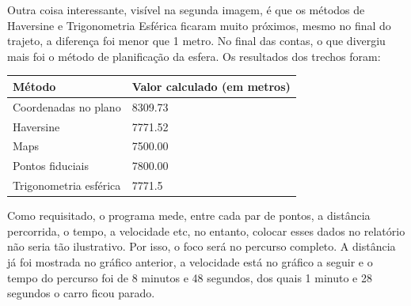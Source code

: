\documentclass{article}
\begin{document}
\qquad Outra coisa interessante, visível na segunda imagem, é que os métodos de Haversine e Trigonometria Esférica ficaram muito próximos, mesmo no final do trajeto, a diferença foi menor que 1 metro. No final das contas, o que divergiu mais foi o método de planificação da esfera. Os resultados dos trechos foram:

\vspace{0.5cm}

{\centering
\begin{tabular}{ | l | l | }
    \hline
    Método & Valor calculado (em metros)\\ \hline
    Coordenadas no plano & 8309.73 \\ \hline
    Haversine & 7771.52 \\\hline
    Maps & 7500.00 \\ \hline
    Pontos fiduciais & 7800.00 \\ \hline
    Trigonometria esférica & 7771.5 \\ \hline
\end{tabular}
\par
}

\vspace{0.5cm}

\qquad Como requisitado, o programa mede, entre cada par de pontos, a distância percorrida, o tempo, a velocidade etc, no entanto, colocar esses dados no relatório não seria tão ilustrativo. Por isso, o foco será no percurso completo. A distância já foi mostrada no gráfico anterior, a velocidade está no gráfico a seguir e o tempo do percurso foi de 8 minutos e 48 segundos, dos quais 1 minuto e 28 segundos o carro ficou parado.
\end{document}

